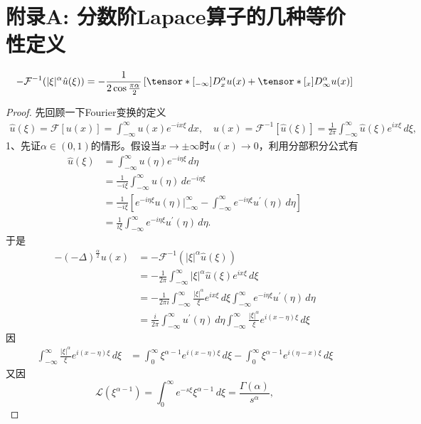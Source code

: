 \section*{附录A: 分数阶Lapace算子的几种等价性定义}
\begin{dingli}
$$
-\mathcal F^{-1}(|\xi|^\alpha\hat u(\xi))=-\frac1{2\cos\frac{\pi\alpha}2}\left[\tensor*[_{-\infty}]{D}{_x^\alpha}u(x)+\tensor*[_x]{D}{_\infty^\alpha}u(x)\right]
$$
\end{dingli}
\begin{proof}
先回顾一下Fourier变换的定义
$$
\begin{aligned}
\hat u(\xi) = \mathcal F[u(x)] = \int_{-\infty}^\infty u(x) e^{-ix\xi}\,dx, \quad 
u(x) = \mathcal F^{-1}[\hat u(\xi)] = \frac1{2\pi}\int_{-\infty}^\infty \hat u(\xi) e^{ix\xi}\,d\xi,
\end{aligned}
$$
1、先证$\alpha\in(0,1)$的情形。假设当$x\to\pm\infty$时$u(x)\to0$，利用分部积分公式有
$$
\begin{aligned}
\hat u(\xi) &= \int_{-\infty}^\infty u(\eta) e^{-i\eta\xi}\,d\eta \\
&=\frac1{-i\xi} \int_{-\infty}^\infty u(\eta) \,de^{-i\eta\xi}\\
&=\frac1{-i\xi} \left[e^{-i\eta\xi}u(\eta)\big|_{-\infty}^\infty-\int_{-\infty}^\infty e^{-i\eta\xi}u^\prime(\eta) \,d\eta\right]\\
&=\frac 1{i\xi}   \int_{-\infty}^\infty e^{-i\eta\xi}u^\prime(\eta) \,d\eta.
\end{aligned}
$$
于是
$$
\begin{aligned}
-(-\Delta)^{\frac\alpha2}u(x)&=-\mathcal F^{-1}(|\xi|^\alpha\hat u(\xi))\\
&=-\frac1{2\pi} \int_{-\infty}^\infty |\xi|^\alpha\hat u(\xi) e^{ix\xi}\,d\xi\\
&=-\frac1{2\pi i} \int_{-\infty}^\infty \frac{|\xi|^\alpha}\xi   e^{ix\xi}\,d\xi \int_{-\infty}^\infty e^{-i\eta\xi}u^\prime(\eta) \,d\eta\\
&=\frac i{2\pi}  \int_{-\infty}^\infty u^\prime(\eta)   \,d\eta \int_{-\infty}^\infty \frac{|\xi|^\alpha}\xi   e^{i(x-\eta)\xi}\,d\xi
\end{aligned}
$$
因
$$
\begin{aligned}
\int_{-\infty}^\infty\frac{|\xi|^\alpha}\xi   e^{i(x-\eta)\xi}\,d\xi &= \int_{0}^\infty \xi^{\alpha-1}   e^{i(x-\eta)\xi}\,d\xi-\int_{0}^\infty \xi^{\alpha-1}   e^{i(\eta-x)\xi}\,d\xi
\end{aligned}
$$
又因
$$
\mathcal L(\xi^{\alpha-1})=\int_0^\infty e^{-s\xi}\xi^{\alpha-1}\,d\xi=\frac{\Gamma(\alpha)}{s^\alpha}, 
$$
\end{proof}
